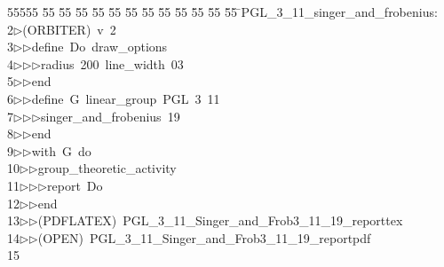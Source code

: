 %
%
\begin{tabbing}
55555 \= 55 \= 55 \= 55 \= 55 \= 55 \= 55 \= 55 \= 55 \= 55 \= 55 \= 55 \= 55 \= \>PGL\_3\_11\_singer\_and\_frobenius:\\[0pt]
2\>$\triangleright$\>(ORBITER)\ v\ 2\ \\[0pt]
3\>$\triangleright$\>$\triangleright$\>define\ Do\ draw\_options\ \\[0pt]
4\>$\triangleright$\>$\triangleright$\>$\triangleright$\>radius\ 200\ line\_width\ 03\ \\[0pt]
5\>$\triangleright$\>$\triangleright$\>end\ \\[0pt]
6\>$\triangleright$\>$\triangleright$\>define\ G\ linear\_group\ PGL\ 3\ 11\ \\[0pt]
7\>$\triangleright$\>$\triangleright$\>$\triangleright$\>singer\_and\_frobenius\ 19\ \\[0pt]
8\>$\triangleright$\>$\triangleright$\>end\ \\[0pt]
9\>$\triangleright$\>$\triangleright$\>with\ G\ do\ \\[0pt]
10\>$\triangleright$\>$\triangleright$\>group\_theoretic\_activity\ \\[0pt]
11\>$\triangleright$\>$\triangleright$\>$\triangleright$\>report\ Do\ \\[0pt]
12\>$\triangleright$\>$\triangleright$\>end\\[0pt]
13\>$\triangleright$\>$\triangleright$\>(PDFLATEX)\ PGL\_3\_11\_Singer\_and\_Frob3\_11\_19\_reporttex\\[0pt]
14\>$\triangleright$\>$\triangleright$\>(OPEN)\ PGL\_3\_11\_Singer\_and\_Frob3\_11\_19\_reportpdf\\[0pt]
15\>\end{tabbing}
